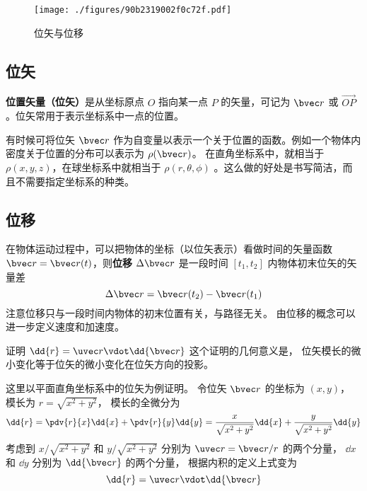 

\begin{figure}[ht]
\centering
\texttt{[image: ./figures/90b2319002f0c72f.pdf]}
\caption{位矢与位移} \label{fig_Disp_1}
\end{figure}

\subsection{位矢}

\textbf{位置矢量（位矢）}是从坐标原点 $O$ 指向某一点 $P$ 的矢量，可记为 $\bvec r$ 或 $\overrightarrow{OP}$。位矢常用于表示坐标系中一点的位置。

有时候可将位矢 $\bvec r$ 作为自变量以表示一个关于位置的函数。例如一个物体内密度关于位置的分布可以表示为 $\rho(\bvec r)$。 在直角坐标系中，就相当于 $\rho(x,y,z)$，在球坐标系中就相当于 $\rho(r,\theta,\phi)$ 。这么做的好处是书写简洁，而且不需要指定坐标系的种类。

\subsection{位移}
在物体运动过程中，可以把物体的坐标（以位矢表示）看做时间的矢量函数 $\bvec r=\bvec r(t)$，则\textbf{位移} $\Delta \bvec r$ 是一段时间 $[t_1,t_2]$ 内物体初末位矢的矢量差
\begin{equation}
\Delta \bvec r = \bvec r(t_2) - \bvec r(t_1)
\end{equation}
注意位移只与一段时间内物体的初末位置有关，与路径无关。 由位移的概念可以进一步定义速度和加速度。

\begin{example}{证明 $\dd{r} = \uvec r \vdot \dd{\bvec r}$}\label{ex_Disp_1}
这个证明的几何意义是， 位矢模长的微小变化等于位矢的微小变化在位矢方向的投影。

这里以平面直角坐标系中的位矢为例证明。 令位矢 $\bvec r$ 的坐标为 $(x, y)$， 模长为 $r = \sqrt{x^2 + y^2}$，
模长的全微分为
\begin{equation}
\dd{r} = \pdv{r}{x} \dd{x} + \pdv{r}{y} \dd{y} = \frac{x}{\sqrt{x^2 + y^2}} \dd{x} + \frac{y}{\sqrt{x^2 + y^2}} \dd{y}
\end{equation}
考虑到 $x/\sqrt{x^2 + y^2}$ 和 $y/\sqrt{x^2 + y^2}$ 分别为 $\uvec r = \bvec r/r$ 的两个分量， $\dd{x}$ 和 $\dd{y}$ 分别为 $\dd{\bvec r}$ 的两个分量， 根据内积的定义上式变为
\begin{equation}
\dd{r} = \uvec r \vdot \dd{\bvec r}
\end{equation}
\end{example}
